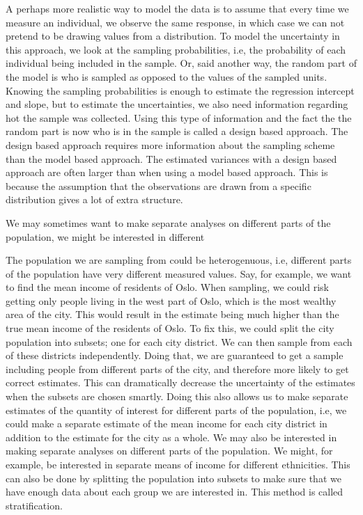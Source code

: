 \documentclass{article}
\begin{document}
A perhaps more realistic way to model the data is to assume that every time we measure an
individual, we observe the same response, in which case we can not pretend to be drawing
values from a distribution. To model the uncertainty in this approach, we look at
the sampling probabilities, i.e, the probability of each individual being
included in the sample. Or, said another way, the random part of the model
is who is sampled as opposed to the values of the sampled units. Knowing the sampling probabilities is enough to
estimate the regression intercept and slope, but to estimate the uncertainties,
we also need information regarding hot the sample was collected.
Using this type of information and the fact the the random part is now who is in
the sample is called a design based approach. The design based approach requires
more information about the sampling scheme than the model based approach. The
estimated variances with a design based approach are often larger than when
using a model based approach. This is because the
assumption that the observations are drawn from a specific distribution gives a
lot of extra structure.

We may sometimes want to make separate analyses on different parts of the
population, we might be interested in different

The population we are sampling from could be heterogenuous, i.e, different
parts of the population have very different measured values. Say, for example, we want
to find the mean income of residents of Oslo. When sampling, we could risk
getting only people living in the west part of Oslo, which is the most wealthy
area of the city. This would result in the estimate being much higher than the true
mean income of the residents of Oslo. To fix this, we could split
the city population into subsets; one for each city district. We can then sample
from each of these districts independently. Doing that, we are guaranteed to get
a sample including people from different parts of the city, and therefore
more likely to get correct estimates. This can dramatically decrease the
uncertainty of the estimates when the subsets are chosen smartly. Doing this also allows us to make
separate estimates of the quantity of interest for different parts of the
population, i.e, we could make a separate estimate of the mean income for each city
district in addition to the estimate for the city as a whole. We may also be
interested in making separate analyses on different parts of the population. We
might, for example, be interested in separate means of income for different
ethnicities. This can also be done by splitting the population into subsets to
make sure that we have enough data about each group we are interested in. This method is
called stratification.
\end{document}
